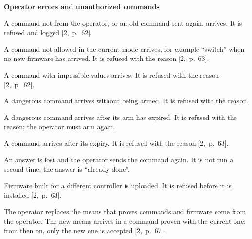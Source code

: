 \documentclass[11pt,a4paper]{article}
\begin{document}
\medskip
{}
\noindent\textbf{Operator errors and unauthorized commands}
\begin{description}[leftmargin=3cm]
\item[Scenario-300] A command not from the operator, or an old command sent
  again, arrives. It is refused and logged [2,~p.~62].
\item[Scenario-310] A command not allowed in the current mode arrives, for
  example ``switch'' when no new firmware has arrived. It is refused with the
  reason [2,~p.~63].
\item[Scenario-320] A command with impossible values arrives. It is refused with
  the reason [2,~p.~62].
\item[Scenario-330] A dangerous command arrives without being armed. It is
  refused with the reason.
\item[Scenario-335] A dangerous command arrives after its arm has expired. It
  is refused with the reason; the operator must arm again.
\item[Scenario-340] A command arrives after its expiry. It is refused with the
  reason [2,~p.~63].
\item[Scenario-350] An answer is lost and the operator sends the command again.
  It is not run a second time; the answer is ``already done''.
\item[Scenario-360] Firmware built for a different controller is uploaded. It is
  refused before it is installed [2,~p.~63].
\item[Scenario-370] The operator replaces the means that proves commands and
  firmware come from the operator. The new means arrives in a command proven
  with the current one; from then on, only the new one is accepted
  [2,~p.~67].
\end{description}
\end{document}
